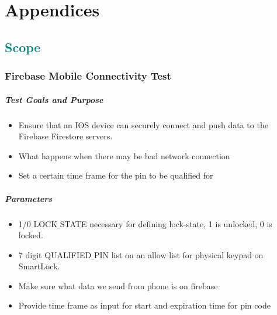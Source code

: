 \documentclass[a4paper,12pt]{article}
\begin{document}















\section{Appendices}

\textcolor{teal}{\subsection{Scope}}
\subsubsection*{Firebase Mobile Connectivity Test}
\subparagraph{Test Goals and Purpose}
\begin{itemize}
    \item Ensure that an IOS device can securely connect and push data to the Firebase Firestore servers.
    \item What happens when there may be bad network connection
    \item Set a certain time frame for the pin to be qualified for
\end{itemize}

\subparagraph{Parameters}
\begin{itemize}
    \item 1/0 LOCK$\_$STATE necessary for defining lock-state, 1 is unlocked, 0 is locked.
    \item 7 digit QUALIFIED$\_$PIN list on an allow list for physical keypad on SmartLock.
    \item Make sure what data we send from phone is on firebase
    \item Provide time frame as input for start and expiration time for pin code
\end{itemize}
\end{document}
